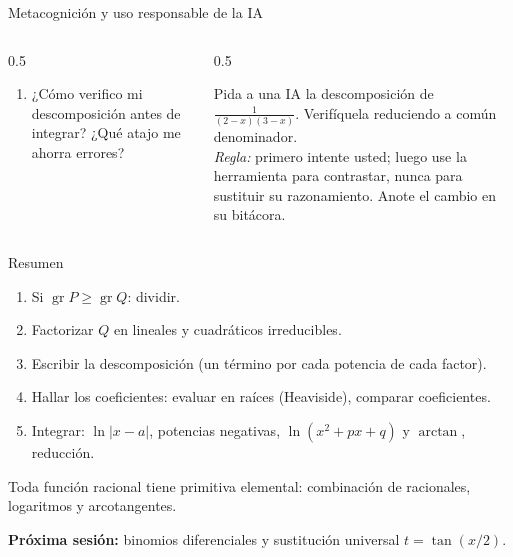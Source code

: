 \documentclass[10pt,aspectratio=169]{beamer}
\begin{document}
\begin{frame}{Metacognición y uso responsable de la IA}
  \small
  \begin{columns}[t]
    \begin{column}{0.5\textwidth}
      \begin{metacog}
        \begin{enumerate}
          \metacomun
          \item ¿Cómo verifico mi descomposición antes de integrar? ¿Qué atajo me ahorra errores?
        \end{enumerate}
      \end{metacog}
    \end{column}
    \begin{column}{0.5\textwidth}
      \begin{iabox}
        Pida a una IA la descomposición de $\frac{1}{(2-x)(3-x)}$. Verifíquela reduciendo a común denominador.\\[2pt]
        \textit{Regla:} primero intente usted; luego use la herramienta para contrastar, nunca para sustituir su razonamiento. Anote el cambio en su bitácora.
      \end{iabox}
    \end{column}
  \end{columns}
\end{frame}

\begin{frame}{Resumen}
  \begin{enumerate}
    \item Si $\operatorname{gr}P\ge\operatorname{gr}Q$: dividir.
    \item Factorizar $Q$ en lineales y cuadráticos irreducibles.
    \item Escribir la descomposición (un término por cada potencia de cada factor).
    \item Hallar los coeficientes: evaluar en raíces (Heaviside), comparar coeficientes.
    \item Integrar: $\ln|x-a|$, potencias negativas, $\ln(x^2+px+q)$ y $\arctan$, reducción.
  \end{enumerate}
  \begin{idea}
    Toda función racional tiene primitiva elemental: combinación de racionales, logaritmos y arcotangentes.
  \end{idea}
  \textbf{Próxima sesión:} binomios diferenciales y sustitución universal $t=\tan(x/2)$.
\end{frame}
\end{document}
